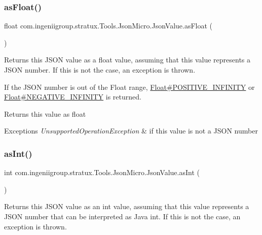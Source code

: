 \subsubsection{\texorpdfstring{as\+Float()}{asFloat()}}
{\footnotesize\ttfamily float com.\+ingeniigroup.\+stratux.\+Tools.\+Json\+Micro.\+Json\+Value.\+as\+Float (\begin{DoxyParamCaption}{ }\end{DoxyParamCaption})}

Returns this J\+S\+ON value as a {\ttfamily float} value, assuming that this value represents a J\+S\+ON number. If this is not the case, an exception is thrown. 

If the J\+S\+ON number is out of the {\ttfamily Float} range, \hyperlink{}{Float\#\+P\+O\+S\+I\+T\+I\+V\+E\+\_\+\+I\+N\+F\+I\+N\+I\+TY} or \hyperlink{}{Float\#\+N\+E\+G\+A\+T\+I\+V\+E\+\_\+\+I\+N\+F\+I\+N\+I\+TY} is returned. 

\begin{DoxyReturn}{Returns}
this value as {\ttfamily float} 
\end{DoxyReturn}

\begin{DoxyExceptions}{Exceptions}
{\em Unsupported\+Operation\+Exception} & if this value is not a J\+S\+ON number \\
\hline
\end{DoxyExceptions}
\mbox{\label{classcom_1_1ingeniigroup_1_1stratux_1_1_tools_1_1_json_micro_1_1_json_value_a0ef914be41a4ebc5f682cbfe3257ac4a}} 
\subsubsection{\texorpdfstring{as\+Int()}{asInt()}}
{\footnotesize\ttfamily int com.\+ingeniigroup.\+stratux.\+Tools.\+Json\+Micro.\+Json\+Value.\+as\+Int (\begin{DoxyParamCaption}{ }\end{DoxyParamCaption})}

Returns this J\+S\+ON value as an {\ttfamily int} value, assuming that this value represents a J\+S\+ON number that can be interpreted as Java {\ttfamily int}. If this is not the case, an exception is thrown. 

